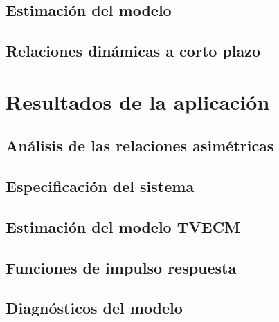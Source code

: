\documentclass[12pt, twoside]{book}\usepackage[]{graphicx}\usepackage[]{color}
\numberwithin{equation}{section}
\numberwithin{theorem}{section}
\numberwithin{teorema}{section}
\numberwithin{defi}{section}
\numberwithin{prop}{section}
\numberwithin{defi}{section}
\theoremstyle{plain}
\begin{document}
\subsection{Estimación del modelo}
\subsection{Relaciones dinámicas a corto plazo}
\section{Resultados de la aplicación}
\subsection{Análisis de las relaciones asimétricas}
\subsection{Especificación del sistema}
\subsection{Estimación del modelo TVECM}
\subsection{Funciones de impulso respuesta}
\subsection{Diagnósticos del modelo}
\end{document}
